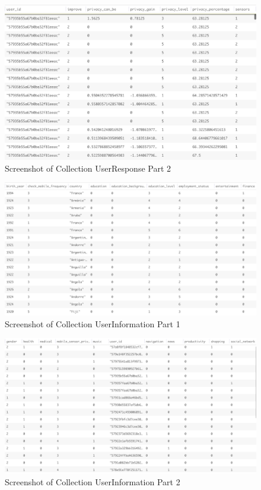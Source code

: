 \begin{figure}[ht!]
\centering
\includegraphics[width=\textwidth,keepaspectratio,height=0.6\textwidth]{./images/collection_ur_2}
\caption{Screenshot of Collection UserResponse Part 2}
\label{fig:col_ur_2}
\end{figure}

\begin{figure}[ht!]
\centering
\includegraphics[width=\textwidth,keepaspectratio,height=0.6\textwidth]{./images/collection_ui_1}
\caption{Screenshot of Collection UserInformation Part 1}
\label{fig:col_ui_1}
\end{figure}

\begin{figure}[ht!]
\centering
\includegraphics[width=\textwidth,keepaspectratio,height=0.6\textwidth]{./images/collection_ui_2}
\caption{Screenshot of Collection UserInformation Part 2}
\label{fig:col_ui_2}
\end{figure}

